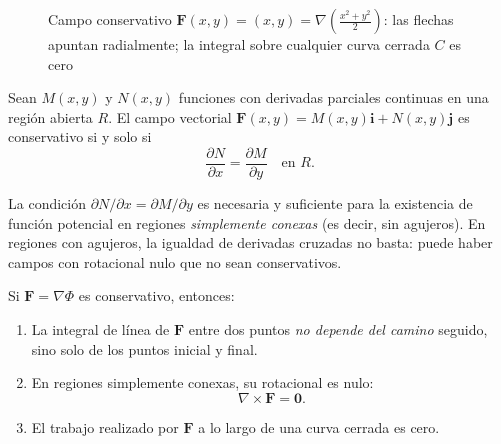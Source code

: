 \begin{figure}[!htbp]
\centering
{}
\caption{Campo conservativo $\mathbf{F}(x,y)=(x,y)=\nabla\!\left(\tfrac{x^2+y^2}{2}\right)$:
  las flechas apuntan radialmente; la integral sobre cualquier curva cerrada $C$ es cero}
\label{fig:campo_conservativo}
\end{figure}
\begin{theorem}
Sean \(M(x,y)\) y \(N(x,y)\) funciones con derivadas parciales continuas
en una región abierta \(R\). El campo vectorial
\(\mathbf{F}(x,y) = M(x,y)\mathbf{i} + N(x,y)\mathbf{j}\) es
conservativo si y solo si
\[
\frac{\partial N}{\partial x} = \frac{\partial M}{\partial y}
\quad \text{en } R.
\]
\end{theorem}

\begin{rem}
La condición \(\partial N/\partial x = \partial M/\partial y\) es
necesaria y suficiente para la existencia de función potencial en
regiones \emph{simplemente conexas} (es decir, sin agujeros). En
regiones con agujeros, la igualdad de derivadas cruzadas no basta:
puede haber campos con rotacional nulo que no sean conservativos.
\end{rem}

\begin{rem}
Si \(\mathbf{F} = \nabla \Phi\) es conservativo, entonces:
\begin{enumerate}
  \item La integral de línea de \(\mathbf{F}\) entre dos puntos
  \emph{no depende del camino} seguido, sino solo de los puntos
  inicial y final.
  \item En regiones simplemente conexas, su rotacional es nulo:
  \[
  \nabla \times \mathbf{F} = \mathbf{0}.
  \]
  \item El trabajo realizado por \(\mathbf{F}\) a lo largo de una
  curva cerrada es cero.
\end{enumerate}
\end{rem}

